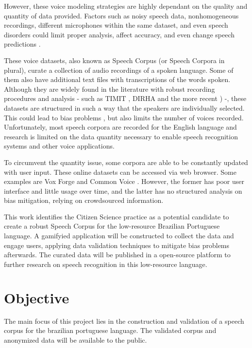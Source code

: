 However, these voice modeling strategies are highly dependant on the quality and quantity of data provided. Factors such as noisy speech data, nonhomogeneous recordings, different microphones within the same dataset, and even speech disorders could limit proper analysis, affect accuracy, and even change speech predictions \cite{wrong}. 

These voice datasets, also known as Speech Corpus (or Speech Corpora in plural), curate a collection of audio recordings of a spoken language. Some of them also have additional text files with transcriptions of the words spoken. Although they are widely found in the literature with robust recording procedures and analysis - such as TIMIT \cite{Lamel1992timmit}, DIRHA \cite{Ravanelli2016dirha} and the more recent \cite{chanchaochai2018globaltimit}) -, these datasets are structured in such a way that the speakers are individually selected. This could lead to bias problems \cite{bender2018data}, but also limits the number of voices recorded. Unfortunately, most speech corpora are recorded for the English language \cite{LeRouxVincent2014TRdatasets} and research is limited on the data quantity necessary to enable speech recognition systems and other voice applications.

To circumvent the quantity issue, some corpora are able to be constantly updated with user input. These online datasets can be accessed via web browser. Some examples are Vox Forge and Common Voice \cite{ardila2019common}. However, the former has poor user interface and little usage over time, and the latter has no structured analysis on bias mitigation, relying on crowdsourced information.

This work identifies the Citizen Science practice as a potential candidate to create a robust Speech Corpus for the low-resource Brazilian Portuguese language. A gamifyied application will be constructed to collect the data and engage users, applying data validation techniques to mitigate bias problems afterwards. The curated data will be published in a open-source platform to further research on speech recognition in this low-resource language.

\chapter{Objective}

The main focus of this project lies in the construction and validation of a speech corpus for the brazilian portuguese language. The validated corpus and anonymized data will be available to the public.

